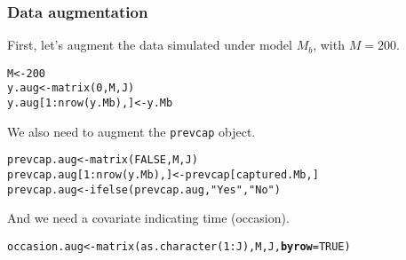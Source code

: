 \documentclass[color=usenames,dvipsnames]{beamer}\usepackage[]{graphicx}\usepackage[]{xcolor}
\makeatletter
\newcommand{\hlnum}[1]{\textcolor[rgb]{0.69,0.494,0}{#1}}%
\newcommand{\hlstr}[1]{\textcolor[rgb]{0.749,0.012,0.012}{#1}}%
\newcommand{\hlopt}[1]{\textcolor[rgb]{0,0,0}{#1}}%
\newcommand{\hlstd}[1]{\textcolor[rgb]{0,0,0}{#1}}%
\newcommand{\hlkwb}[1]{\textcolor[rgb]{0,0.341,0.682}{#1}}%
\newcommand{\hlkwc}[1]{\textcolor[rgb]{0,0,0}{\textbf{#1}}}%
\newcommand{\hlkwd}[1]{\textcolor[rgb]{0.004,0.004,0.506}{#1}}%
\newenvironment{kframe}{%
 \def\at@end@of@kframe{}%
 \ifinner\ifhmode%
  \def\at@end@of@kframe{\end{minipage}}%
  \begin{minipage}{\columnwidth}%
 \fi\fi%
 \def\FrameCommand##1{\hskip\@totalleftmargin \hskip-\fboxsep
 \colorbox{shadecolor}{##1}\hskip-\fboxsep
     \hskip-\linewidth \hskip-\@totalleftmargin \hskip\columnwidth}%
 \MakeFramed {\advance\hsize-\width
   \@totalleftmargin\z@ \linewidth\hsize
   \@setminipage}}%
 {\par\unskip\endMakeFramed%
 \at@end@of@kframe}
\newenvironment{knitrout}{}{} %
\newcommand{\inr}[1]{\colorbox{inlinecolor}{\texttt{#1}}}
\makeatother
\begin{document}
\begin{frame}[fragile]
  \frametitle{Data augmentation}
  First, let's augment the data simulated under model $M_b$, with
  $M=200$. \\
\begin{knitrout}\scriptsize
{}\color{fgcolor}\begin{kframe}
\begin{alltt}
\hlstd{M} \hlkwb{<-} \hlnum{200}
\hlstd{y.aug} \hlkwb{<-} \hlkwd{matrix}\hlstd{(}\hlnum{0}\hlstd{, M, J)}
\hlstd{y.aug[}\hlnum{1}\hlopt{:}\hlkwd{nrow}\hlstd{(y.Mb),]} \hlkwb{<-} \hlstd{y.Mb}
\end{alltt}
\end{kframe}
\end{knitrout}
\pause
\vfill
We also need to augment the \inr{prevcap} object. \\
\begin{knitrout}\scriptsize
{}\color{fgcolor}\begin{kframe}
\begin{alltt}
\hlstd{prevcap.aug} \hlkwb{<-} \hlkwd{matrix}\hlstd{(}\hlnum{FALSE}\hlstd{, M, J)}
\hlstd{prevcap.aug[}\hlnum{1}\hlopt{:}\hlkwd{nrow}\hlstd{(y.Mb),]} \hlkwb{<-} \hlstd{prevcap[captured.Mb,]}
\hlstd{prevcap.aug} \hlkwb{<-} \hlkwd{ifelse}\hlstd{(prevcap.aug,} \hlstr{"Yes"}\hlstd{,} \hlstr{"No"}\hlstd{)}
\end{alltt}
\end{kframe}
\end{knitrout}
\pause
\vfill
And we need a covariate indicating time (occasion). \\
\begin{knitrout}\scriptsize
{}\color{fgcolor}\begin{kframe}
\begin{alltt}
\hlstd{occasion.aug} \hlkwb{<-} \hlkwd{matrix}\hlstd{(}\hlkwd{as.character}\hlstd{(}\hlnum{1}\hlopt{:}\hlstd{J), M, J,} \hlkwc{byrow}\hlstd{=}\hlnum{TRUE}\hlstd{)}
\end{alltt}
\end{kframe}
\end{knitrout}
\end{frame}
\end{document}
